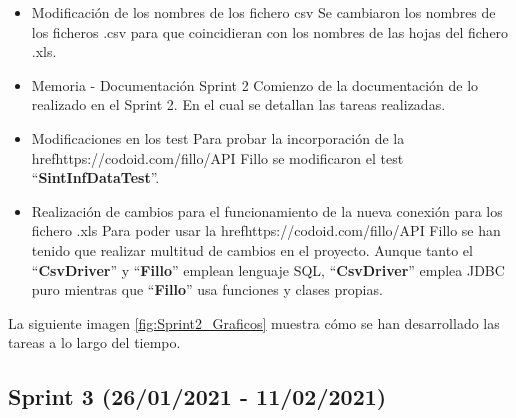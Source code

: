 \begin{itemize}
	\item Modificación de los nombres de los fichero csv 
		Se cambiaron los nombres de los ficheros .csv para que coincidieran con los nombres de las hojas del fichero .xls. 
	\item Memoria - Documentación Sprint 2
		Comienzo de la documentación de lo realizado en el Sprint 2. En el cual se detallan las tareas realizadas.
	\item Modificaciones en los test
		Para probar la incorporación de la href{https://codoid.com/fillo/}{API Fillo} se modificaron el test  ``\textbf{\textbf{SintInfDataTest}}''.
	\item Realización de cambios para el funcionamiento de la nueva conexión para los fichero .xls 
		Para poder usar la href{https://codoid.com/fillo/}{API Fillo} se han tenido que realizar multitud de cambios en el proyecto. Aunque tanto el ``\textbf{\textbf{CsvDriver}}'' y ``\textbf{\textbf{Fillo}}'' emplean lenguaje SQL, ``\textbf{CsvDriver}'' emplea JDBC puro mientras que ``\textbf{Fillo}'' usa funciones y clases propias.
\end{itemize}

La siguiente imagen \ref{fig:Sprint2_Graficos} muestra cómo se han desarrollado las tareas a lo largo del tiempo.


\subsection{Sprint 3 (26/01/2021 - 11/02/2021)}

